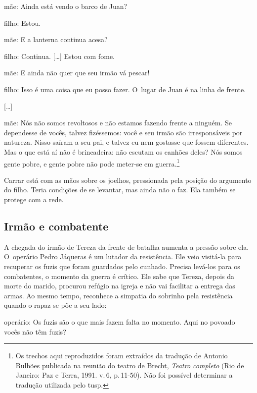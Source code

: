 \startblockquote
{\sc mãe}: Ainda está vendo o barco de Juan?

{\sc filho}: Estou.

{\sc mãe}: E a lanterna continua acesa?

{\sc filho}: Continua. {[}\ldots{]} Estou com fome.

{\sc mãe}: E ainda não quer que seu irmão vá pescar!

{\sc filho}: Isso é uma coisa que eu posso fazer. O~lugar de Juan é na linha
de frente.

{[}\ldots{]}

{\sc mãe}: Nós não somos revoltosos e não estamos fazendo frente a ninguém.
Se dependesse de vocês, talvez fizéssemos: você e seu irmão são
irresponsáveis por natureza. Nisso saíram a seu pai, e talvez eu nem
gostasse que fossem diferentes. Mas o que está aí não é brincadeira: não
escutam os canhões deles? Nós somos gente pobre, e gente pobre não pode
meter-se em guerra.\footnote{Os trechos aqui reproduzidos foram
  extraídos da tradução de Antonio Bulhões publicada na reunião do
  teatro de Brecht, {\it Teatro completo} (Rio de Janeiro: Paz e Terra,
  1991. v.\,6, p.\,11-50). Não foi possível determinar a tradução
  utilizada pelo {\sc tusp}.}
\stopblockquote

Carrar está com as mãos sobre os joelhos, pressionada pela posição do
argumento do filho. Teria condições de se levantar, mas ainda não o faz.
Ela também se protege com a rede.


\subsection{Irmão e combatente}

A chegada do irmão de Tereza da frente de batalha aumenta a pressão
sobre ela. O~operário Pedro Jáqueras é um lutador da resistência. Ele
veio visitá-la para recuperar os fuzis que foram guardados pelo cunhado.
Precisa levá-los para os combatentes, o momento da guerra é crítico. Ele
sabe que Tereza, depois da morte do marido, procurou refúgio na igreja e
não vai facilitar a entrega das armas. Ao mesmo tempo, reconhece a
simpatia do sobrinho pela resistência quando o rapaz se põe a seu lado:

\startblockquote
{\sc operário}: Os fuzis são o que mais fazem falta no momento. Aqui no
povoado vocês não têm fuzis?

